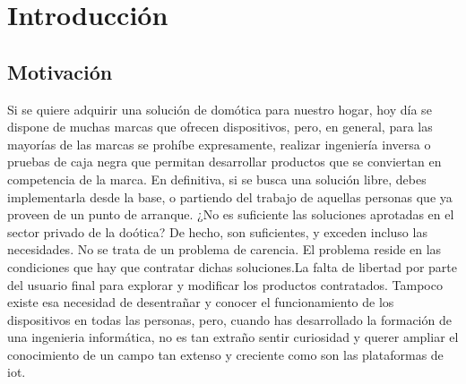 \cleardoublepage

\chapter{Introducción}

\section{Motivación}
\label{ch:Capitulo1}

Si se quiere adquirir una solución de domótica para nuestro hogar, hoy día se dispone de muchas marcas que ofrecen dispositivos, pero, en general, para las mayorías de las marcas se prohíbe expresamente, realizar ingeniería inversa o pruebas de caja negra que permitan desarrollar productos que se conviertan en competencia de la marca. En definitiva, si se busca una solución libre, debes implementarla desde la base, o partiendo del trabajo de aquellas personas que ya proveen de un punto de arranque. ¿No es suficiente las soluciones aprotadas en el sector privado de la doótica? De hecho, son suficientes, y exceden incluso las necesidades. No se trata de un problema de carencia. El problema reside en las condiciones que hay que contratar dichas soluciones.La falta de libertad por parte del usuario final para explorar y modificar los productos contratados. Tampoco existe esa necesidad de desentrañar y conocer el funcionamiento de los dispositivos en todas las personas, pero, cuando has desarrollado la formación de una ingenieria informática, no es tan extraño sentir curiosidad y querer ampliar el conocimiento de un campo tan extenso y creciente como son las plataformas de \gls{iot}.

\vspace{1cm}

